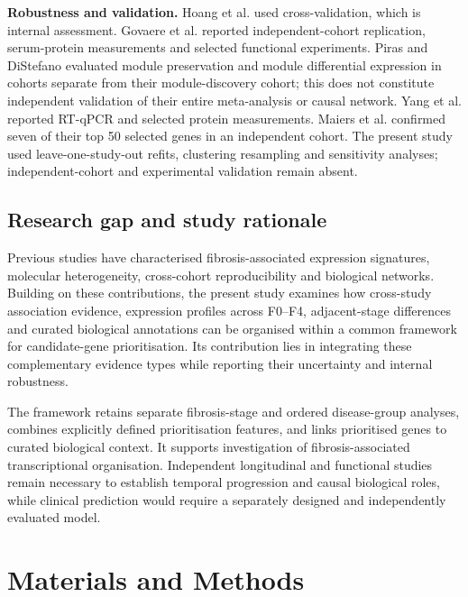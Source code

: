 \documentclass[11pt,a4paper]{article}
\begin{document}
\textbf{Robustness and validation.} Hoang et al. used cross-validation, which is internal assessment. Govaere et al. reported independent-cohort replication, serum-protein measurements and selected functional experiments. Piras and DiStefano evaluated module preservation and module differential expression in cohorts separate from their module-discovery cohort; this does not constitute independent validation of their entire meta-analysis or causal network. Yang et al. reported RT-qPCR and selected protein measurements. Maiers et al. confirmed seven of their top 50 selected genes in an independent cohort. The present study used leave-one-study-out refits, clustering resampling and sensitivity analyses; independent-cohort and experimental validation remain absent.
\endgroup

\subsection*{Research gap and study rationale}
Previous studies have characterised fibrosis-associated expression signatures, molecular heterogeneity, cross-cohort reproducibility and biological networks. Building on these contributions, the present study examines how cross-study association evidence, expression profiles across F0--F4, adjacent-stage differences and curated biological annotations can be organised within a common framework for candidate-gene prioritisation. Its contribution lies in integrating these complementary evidence types while reporting their uncertainty and internal robustness.

The framework retains separate fibrosis-stage and ordered disease-group analyses, combines explicitly defined prioritisation features, and links prioritised genes to curated biological context. It supports investigation of fibrosis-associated transcriptional organisation. Independent longitudinal and functional studies remain necessary to establish temporal progression and causal biological roles, while clinical prediction would require a separately designed and independently evaluated model.

\section*{Materials and Methods}
\end{document}
